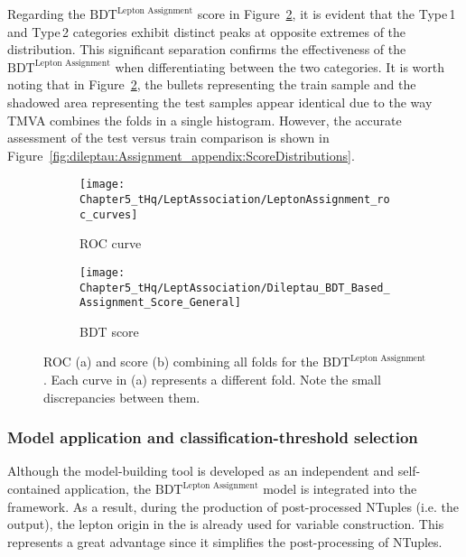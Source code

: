Regarding the $\text{BDT}^{\text{Lepton Assignment}}$
 score in Figure~\ref{fig:dileptau:Assignment:ROC_and_Score:Score}, 
it is evident that the Type$\,$1 and Type$\,$2 categories exhibit distinct peaks at opposite 
extremes of the distribution. This significant separation confirms the effectiveness of the 
$\text{BDT}^{\text{Lepton Assignment}}$
 when differentiating between the two categories. It is worth noting that in Figure~\ref{fig:dileptau:Assignment:ROC_and_Score:Score}, the bullets 
representing the train sample and the shadowed area representing the test samples 
appear identical due to the way TMVA combines the folds in a single histogram. 
However, the accurate assessment of the test versus train comparison is shown in Figure~\ref{fig:dileptau:Assignment_appendix:ScoreDistributions}.

\begin{figure}[h]
  \begin{subfigure}[h]{0.51\linewidth}
  	\texttt{[image: Chapter5\_tHq/LeptAssociation/LeptonAssignment\_roc\_curves]}
	\caption{ROC curve}
	\label{fig:dileptau:Assignment:ROC_and_Score:ROC}
  \end{subfigure}
  \begin{subfigure}[h]{0.49\linewidth}
	\texttt{[image: Chapter5\_tHq/LeptAssociation/Dileptau\_BDT\_Based\_Assignment\_Score\_General]}
	\caption{BDT score} 
	\label{fig:dileptau:Assignment:ROC_and_Score:Score}
  \end{subfigure}%
\caption{ROC (a) and score (b) combining all folds for the $\text{BDT}^{\text{Lepton Assignment}}$.
Each curve in (a) represents a different fold. Note the small discrepancies between them. }
\label{fig:dileptau:Assignment:ROC_and_Score}
\end{figure}
		 

\subsubsection{Model application and classification-threshold selection}
\label{sec:ChaptH:Sig:LepAsign:SS:BDT:Application}


Although the model-building tool is developed as an independent 
and self-contained application, the $\text{BDT}^{\text{Lepton Assignment}}$
model is integrated into the \thqloop framework. As a result, during the production 
of post-processed NTuples (i.e. the \thqloop output), the lepton origin in the 
\dilepSStau is already used for variable construction. 
This represents a great advantage since it simplifies the post-processing of NTuples.

